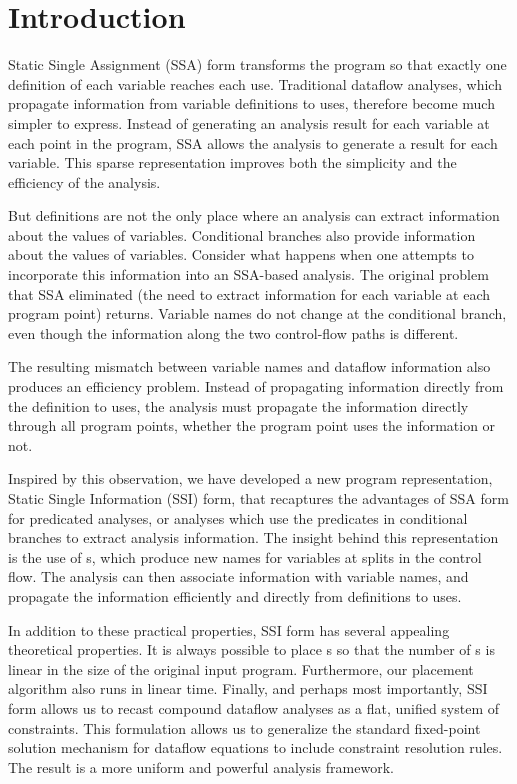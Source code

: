 \section{Introduction}

Static Single Assignment (SSA) form transforms the
program so that exactly one definition of each 
variable reaches each use. Traditional dataflow
analyses, which propagate information from variable
definitions to uses, therefore become much simpler
to express. Instead of generating an analysis 
result for each variable at each point in the
program, SSA allows the analysis to generate a 
result for each variable. This sparse
representation improves both the simplicity
and the efficiency of the analysis. 

But definitions are not the only place where
an analysis can extract information about the
values of variables. Conditional branches also
provide information about the values of variables.
Consider what happens when one attempts to incorporate
this information into an SSA-based analysis. The
original problem that SSA eliminated (the need to
extract information for each variable at each
program point) returns. Variable names do not
change at the conditional branch, even though
the information along the two control-flow
paths is different.

The resulting mismatch between variable names
and dataflow information also produces an efficiency
problem. Instead of propagating information
directly from the definition to uses, the analysis
must propagate the information directly through all 
program points, whether the program point uses
the information or not. 

Inspired by this observation, we have developed
a new program representation, 
Static Single Information (SSI) form,  that recaptures
the advantages of SSA form for predicated analyses,
or analyses which use the predicates in conditional
branches to extract analysis information.
The insight behind this representation is the use
of \sigfunction{}s, which produce new names
for variables at splits in the control flow.
The analysis can then associate information
with variable names, and propagate
the information efficiently and directly from 
definitions to uses. 

In addition to these practical properties, 
SSI form has several appealing 
theoretical properties. It is always possible 
to place \sigfunction{}s so that the
number of \sigfunction{}s is linear in the size
of the original input program. Furthermore, our
placement algorithm also runs in linear time. 
Finally, and perhaps most importantly, SSI form
allows us to recast compound dataflow analyses as
a flat, unified system of constraints. This
formulation allows us to generalize the standard
fixed-point solution
mechanism for dataflow equations to include 
constraint resolution rules. The result is 
a more uniform and powerful analysis framework.

